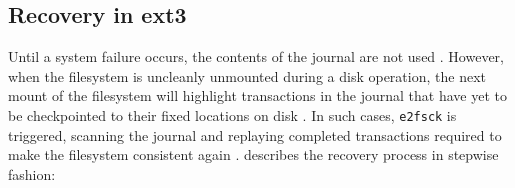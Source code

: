 \subsection{Recovery in ext3}

Until a system failure occurs, the contents of the journal are not used \citep{Bovet2006}. However, when the filesystem is uncleanly unmounted during a disk operation, the next mount of the filesystem will highlight transactions in the journal that have yet to be checkpointed to their fixed locations on disk \citep{Katiyar2011}. In such cases, \texttt{e2fsck} is triggered, scanning the journal and replaying completed transactions required to make the filesystem consistent again \citep{Bovet2006}. \citet[p. 8-9]{Katiyar2011} describes the recovery process in stepwise fashion:

